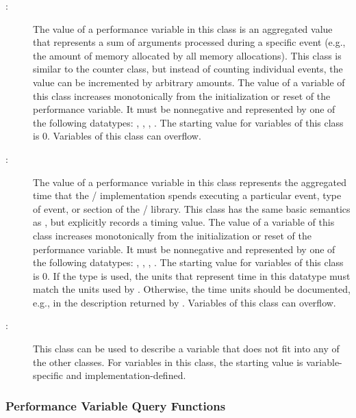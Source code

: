 \begin{sloppy}
\begin{description}
\item[:]The value of a performance
  variable in this class is an aggregated value that represents a sum of
  arguments processed during a specific event (e.g., the amount of memory
  allocated by all memory allocations).  This class is similar to the
  counter class, but instead of counting individual events, the value can
  be incremented by arbitrary amounts.  The value of a variable of this
  class increases monotonically from the initialization or reset of the
  performance variable.  It must be nonnegative and represented by one of
  the following datatypes: ,
  , ,
  .  The starting value for variables of this class is
  0.  Variables of this class can overflow.

\item[:]The value of a performance
  variable in this class represents the aggregated time that the \MPI/
  implementation spends executing a particular event, type of event, or
  section of the \MPI/ library.  This class has the same basic semantics as
  , but explicitly records a timing
  value.  The value of a variable of this class increases monotonically
  from the initialization or reset of the performance variable.  It must be
  nonnegative and represented by one of the following datatypes:
  , ,
  , .  The starting
  value for variables of this class is 0.  If the type 
  is used, the units that represent time in this datatype must match the
  units used by .  Otherwise, the time units should be
  documented, e.g., in the description returned by
  .  Variables of this class can overflow.

\item[:]This class can be used to
  describe a variable that does not fit into any of the other classes.  For
  variables in this class, the starting value is variable-specific and
  implementation-defined.

\end{description}

\end{sloppy}

\subsubsection{Performance Variable Query Functions}

